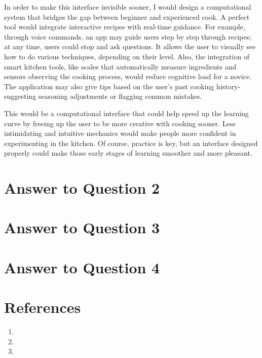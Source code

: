 \documentclass[
	letterpaper, %
]{jdf}
\begin{document}
In order to make this interface invisible sooner, I would design a computational system that bridges the gap between beginner and experienced cook. A perfect tool would integrate interactive recipes with real-time guidance. For example, through voice commands, an app may guide users step by step through recipes; at any time, users could stop and ask questions. It allows the user to visually see how to do various techniques, depending on their level. Also, the integration of smart kitchen tools, like scales that automatically measure ingredients and sensors observing the cooking process, would reduce cognitive load for a novice. The application may also give tips based on the user's past cooking history-suggesting seasoning adjustments or flagging common mistakes.

This would be a computational interface that could help speed up the learning curve by freeing up the user to be more creative with cooking sooner. Less intimidating and intuitive mechanics would make people more confident in experimenting in the kitchen. Of course, practice is key, but an interface designed properly could make those early stages of learning smoother and more pleasant.
\newpage

\section{Answer to Question 2}
 
\newpage

\section{Answer to Question 3}
\subsection {}

\newpage

\section{Answer to Question 4}


\newpage

\section{References}

\printbibliography[heading=none]
\begin{enumerate}
    \item 
    \item 
    \item 

\end{enumerate}
\end{document}
